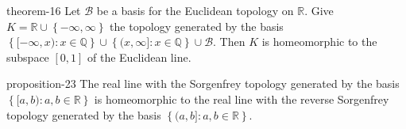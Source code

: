 \documentclass[10pt,]{article}
\newcommand{\mb}{\mathbb}
\newcommand{\mc}{\mathcal}
\newcommand{\setBuilder}[2]{\left\{#1:#2\right\}}
\newcommand{\setList}[1]{\left\{#1\right\}}
\begin{document}
\begin{theorem}{}{}{theorem-16}%
\hypertarget{p-101}{}%
Let \(\mc B\) be a basis for the Euclidean topology on \(\mb R\). Give \(K=\mb R\cup\setList{-\infty,\infty}\) the topology generated by the basis \(\setBuilder{[-\infty,x)}{x\in\mb Q}\cup
\setBuilder{(x,\infty]}{x\in\mb Q}\cup\mc B\). Then \(K\) is homeomorphic to the subspace \([0,1]\) of the Euclidean line.%
\end{theorem}
\begin{proposition}{}{}{proposition-23}%
\hypertarget{p-102}{}%
The real line with the Sorgenfrey topology generated by the basis \(\setBuilder{[a,b)}{a,b\in\mb R}\) is homeomorphic to the real line with the reverse Sorgenfrey topology generated by the basis \(\setBuilder{(a,b]}{a,b\in\mb R}\).%
\end{proposition}
%
%
\typeout{************************************************}
\typeout{************************************************}
%
\end{document}
